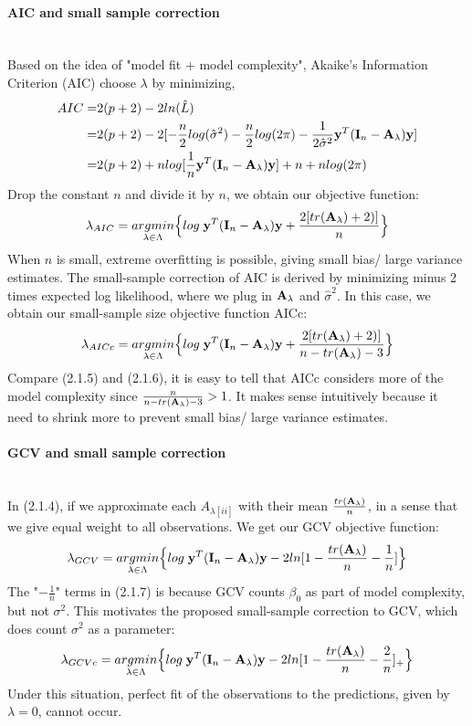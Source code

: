\documentclass[11pt]{article}
\begin{document}
\paragraph{AIC and small sample correction}\mbox{}\\
Based on the idea of "model fit + model complexity", Akaike's Information Criterion (AIC) choose $\lambda$ by minimizing,
\begin{align*}
AIC=&2(p+2)-2ln(\hat{L})\\
=&2(p+2)-2[-\frac{n}{2}log (\hat{\sigma}^2)-\frac{n}{2}log (2\pi)-\frac{1}{2\hat{\sigma}^2}{\bf y}^T({\bf I}_n-{\bf A}_\lambda){\bf y}]\\
=&2(p+2)+n log[\frac{1}{n}{\bf y}^T({\bf I}_n-{\bf A}_\lambda){\bf y}]+n+n log(2\pi)
\end{align*}
Drop the constant $n$ and divide it by $n$, we obtain our objective function:
\begin{align}
\lambda_{AIC}=\underset{\lambda \in \Lambda}{argmin}\Big\{log\; {\bf y}^T({\bf I}_n-{\bf A}_\lambda){\bf y}+\frac{2[tr({\bf A}_\lambda)+2)]}{n}\Big\}
\end{align}
When $n$ is small, extreme overfitting is possible, giving small bias/ large variance estimates. The small-sample correction of AIC is derived by minimizing minus 2 times expected log likelihood, where we plug in ${\bf A}_\lambda$ and $\hat{\sigma}^2$. In this case, we obtain our small-sample size objective function AICc:
\begin{align}
\lambda_{AICc}=\underset{\lambda \in \Lambda}{argmin}\Big\{log\; {\bf y}^T({\bf I}_n-{\bf A}_\lambda){\bf y}+\frac{2[tr({\bf A}_\lambda)+2)]}{n-tr({\bf A}_\lambda)-3}\Big\}
\end{align}
Compare (2.1.5) and (2.1.6), it is easy to tell that AICc considers more of the model complexity since $\frac{n}{n-tr({\bf A}_\lambda)-3}>1$. It makes sense intuitively because it need to shrink more to prevent small bias/ large variance estimates.

\paragraph{GCV and small sample correction}\mbox{}\\
In (2.1.4), if we approximate each $A_{\lambda[ii]}$ with their mean $\frac{tr({\bf A}_\lambda)}{n}$, in a sense that we give equal weight to all observations. We get our GCV objective function:
\begin{align}
\lambda_{GCV}=\underset{\lambda \in \Lambda}{argmin}\Big\{log\; {\bf y}^T({\bf I}_n-{\bf A}_\lambda){\bf y}-2ln[1-\frac{tr({\bf A}_\lambda)}{n}-\frac{1}{n}]\Big\}
\end{align}
The "$-\frac{1}{n}$" terms in (2.1.7) is because GCV counts $\beta_0$ as part of model complexity, but not $\sigma^2$. This motivates the proposed small-sample correction to GCV, which does count $\sigma^2$ as a parameter:
\begin{align}
\lambda_{GCVc}=\underset{\lambda \in \Lambda}{argmin}\Big\{log\; {\bf y}^T({\bf I}_n-{\bf A}_\lambda){\bf y}-2ln[1-\frac{tr({\bf A}_\lambda)}{n}-\frac{2}{n}]_+\Big\}
\end{align}
Under this situation, perfect fit of the observations to the predictions, given by $\lambda=0$, cannot occur.
\end{document}
